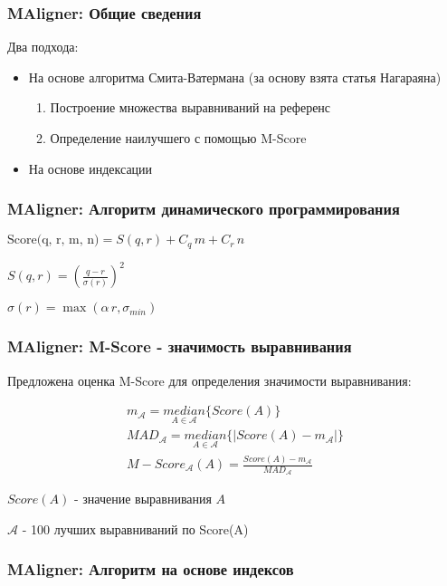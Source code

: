 \begin{frame}
\frametitle{MAligner: Общие сведения}
Два подхода:
\begin{itemize}
  \item На основе алгоритма Смита-Ватермана (за основу взята статья Нагараяна)
  \begin{enumerate}
    \item Построение множества выравниваний на референс
    \item Определение наилучшего с помощью M-Score
  \end{enumerate}
  \item На основе индексации
\end{itemize}
\end{frame}

\begin{frame}
\frametitle{MAligner: Алгоритм динамического программирования}


$\text{Score(q, r, m, n)} = S(q, r) + C_q \,m + C_r \, n$

$S(q, r) = (\frac{q - r}{\sigma(r)})^2$

$\sigma(r) = \max(\alpha \, r, \sigma_{min})$

\end{frame}

\begin{frame}
\frametitle{MAligner: M-Score - значимость выравнивания}

Предложена оценка M-Score для определения значимости выравнивания:

\begin{gather*}
  m_{\mathcal{A}} = \underset{A \in \mathcal{A}}{median}\{Score(A)\} \\
  MAD_{\mathcal{A}} = \underset{A \in \mathcal{A}}{median}\{ | Score(A) - m_{\mathcal{A}}|\} \\
  M-Score_{\mathcal{A}}(A) = \frac{Score(A) - m_{\mathcal{A}}}{MAD_{\mathcal{A}}}
\end{gather*}

$Score(A)$ - значение выравнивания $A$

$\mathcal{A}$ - 100 лучших выравниваний по Score(A)
\end{frame}


\begin{frame}
\frametitle{MAligner: Алгоритм на основе индексов}

\end{frame}
